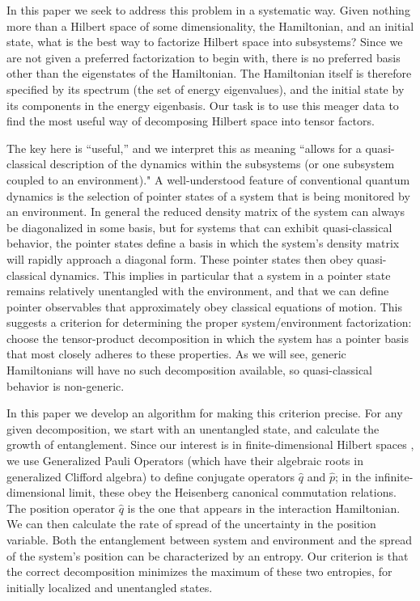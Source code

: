 \documentclass[aps,pra,onecolumn,nofootinbib,12pt,tightenlines]{revtex4-1}
\begin{document}
In this paper we seek to address this problem in a systematic way.
Given nothing more than a Hilbert space of some dimensionality, the Hamiltonian, and an initial state, what is the best way to factorize Hilbert space into subsystems?
Since we are not given a preferred factorization to begin with, there is no preferred basis other than the eigenstates of the Hamiltonian.
The Hamiltonian itself is therefore specified by its spectrum (the set of energy eigenvalues), and the initial state by its components in the energy eigenbasis.
Our task is to use this meager data to find the most useful way of decomposing Hilbert space into tensor factors. 

The key here is ``useful,'' and we interpret this as meaning ``allows for a quasi-classical description of the dynamics within the subsystems (or one subsystem coupled to an environment)."
A well-understood feature of conventional quantum dynamics is the selection of pointer states of a system that is being monitored by an environment. 
In general the reduced density matrix of the system can always be diagonalized in some basis, but for systems that can exhibit quasi-classical behavior, the pointer states define a basis in which the system's density matrix will rapidly approach a diagonal form.
These pointer states then obey quasi-classical dynamics.
This implies in particular that a system in a pointer state remains relatively unentangled with the environment, and that we can define pointer observables that approximately obey classical equations of motion. 
This suggests a criterion for determining the proper system/environment factorization: choose the tensor-product decomposition in which the system has a pointer basis that most closely adheres to these properties.
As we will see, generic Hamiltonians will have no such decomposition available, so quasi-classical behavior is non-generic.

In this paper we develop an algorithm for making this criterion precise.
For any given decomposition, we start with an unentangled state, and calculate the growth of entanglement.
Since our interest is in finite-dimensional Hilbert spaces \cite{Bao:2017rnv,Banks2000,Fischler2000}, we use Generalized Pauli Operators (which have their algebraic roots in generalized Clifford algebra) to define conjugate operators $\hat q$ and $\hat p$; in the infinite-dimensional limit, these obey the Heisenberg canonical commutation relations. 
The position operator $\hat q$ is the one that appears in the interaction Hamiltonian.
We can then calculate the rate of spread of the uncertainty in the position variable.
Both the entanglement between system and environment and the spread of the system's position can be characterized by an entropy.
Our criterion is that the correct decomposition minimizes the maximum of these two entropies, for initially localized and unentangled states.
\end{document}
